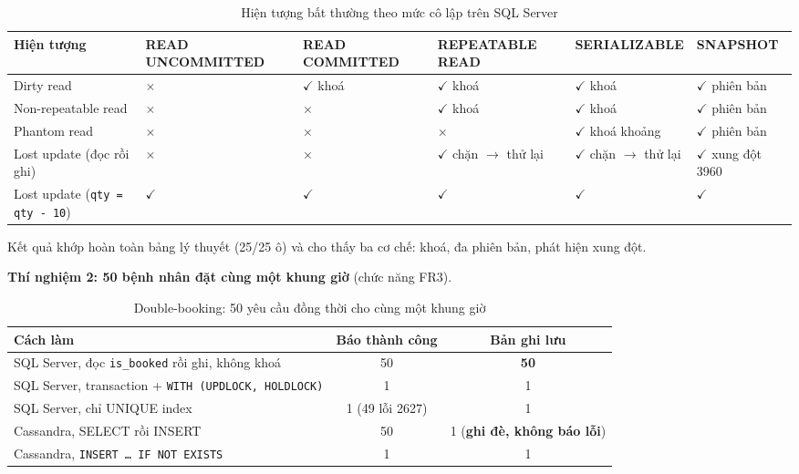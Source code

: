 \begin{table}[H]
\centering
\caption{Hiện tượng bất thường theo mức cô lập trên SQL Server}
\label{tab:isolation}
\small
\begin{tabularx}{\linewidth}{|p{3.2cm}|X|X|X|X|X|}
\hline
\textbf{Hiện tượng} & \textbf{READ UNCOMMITTED} & \textbf{READ COMMITTED} & \textbf{REPEATABLE READ} & \textbf{SERIALIZABLE} & \textbf{SNAPSHOT} \\ \hline
Dirty read & $\times$ & $\checkmark$ khoá & $\checkmark$ khoá & $\checkmark$ khoá & $\checkmark$ phiên bản \\ \hline
Non-repeatable read & $\times$ & $\times$ & $\checkmark$ khoá & $\checkmark$ khoá & $\checkmark$ phiên bản \\ \hline
Phantom read & $\times$ & $\times$ & $\times$ & $\checkmark$ khoá khoảng & $\checkmark$ phiên bản \\ \hline
Lost update (đọc rồi ghi) & $\times$ & $\times$ & $\checkmark$ chặn $\rightarrow$ thử lại & $\checkmark$ chặn $\rightarrow$ thử lại & $\checkmark$ xung đột 3960 \\ \hline
Lost update (\texttt{qty = qty - 10}) & $\checkmark$ & $\checkmark$ & $\checkmark$ & $\checkmark$ & $\checkmark$ \\ \hline
\end{tabularx}
\end{table}

Kết quả khớp hoàn toàn bảng lý thuyết (25/25 ô) và cho thấy ba cơ chế: khoá, đa phiên bản, phát hiện xung đột.

\textbf{Thí nghiệm 2: 50 bệnh nhân đặt cùng một khung giờ} (chức năng FR3).

\begin{table}[H]
\centering
\caption{Double-booking: 50 yêu cầu đồng thời cho cùng một khung giờ}
\label{tab:double-booking}
\begin{tabular}{|l|c|c|}
\hline
\textbf{Cách làm} & \textbf{Báo thành công} & \textbf{Bản ghi lưu} \\ \hline
SQL Server, đọc \texttt{is\_booked} rồi ghi, không khoá & 50 & \textbf{50} \\ \hline
SQL Server, transaction + \texttt{WITH (UPDLOCK, HOLDLOCK)} & 1 & 1 \\ \hline
SQL Server, chỉ UNIQUE index & 1 (49 lỗi 2627) & 1 \\ \hline
Cassandra, SELECT rồi INSERT & 50 & 1 (\textbf{ghi đè, không báo lỗi}) \\ \hline
Cassandra, \texttt{INSERT \ldots{} IF NOT EXISTS} & 1 & 1 \\ \hline
\end{tabular}
\end{table}

